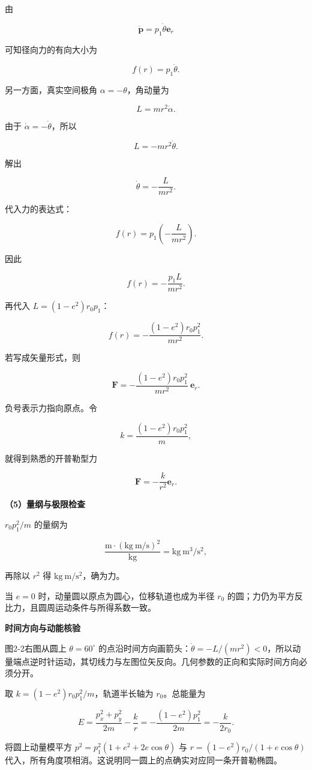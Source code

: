 \documentclass[12pt,a4paper,UTF8]{ctexart}
\begin{document}
由

\[\dot{\bm p}=p_1\dot\theta\bm e_r\]

可知径向力的有向大小为

\[f(r)=p_1\dot\theta.\]

另一方面，真实空间极角 \(\alpha=-\theta\)，角动量为

\[L=mr^2\dot\alpha.\]

由于 \(\dot\alpha=-\dot\theta\)，所以

\[L=-mr^2\dot\theta.\]

解出

\[\dot\theta=-\frac{L}{mr^2}.\]

代入力的表达式：

\[f(r)=p_1\left(-\frac{L}{mr^2}\right).\]

因此

\[f(r)=-\frac{p_1L}{m r^2}.\]

再代入 \(L=(1-e^2)r_0p_1\)：

\[\boxed{
f(r)=-\frac{(1-e^2)r_0p_1^2}{m r^2}
}.\]

若写成矢量形式，则

\[\boxed{
\bm F=-\frac{(1-e^2)r_0p_1^2}{m r^2}\ \bm e_r
}.\]

负号表示力指向原点。令

\[k=\frac{(1-e^2)r_0p_1^2}{m},\]

就得到熟悉的开普勒型力

\[\bm F=-\frac{k}{r^2}\bm e_r.\]

\textbf{（5）量纲与极限检查}

\(r_0p_1^2/m\) 的量纲为

\[\frac{\mathrm m\cdot(\mathrm{kg}\ \mathrm{m/s})^2}{\mathrm{kg}}
=\mathrm{kg}\ \mathrm{m^3/s^2},\]

再除以 \(r^2\) 得 \(\mathrm{kg}\ \mathrm{m/s^2}\)，确为力。

当 \(e=0\) 时，动量圆以原点为圆心，位移轨道也成为半径 \(r_0\)
的圆；力仍为平方反比力，且圆周运动条件与所得系数一致。

\textbf{时间方向与动能核验}

图2-2右图从圆上 \(\theta=60^\circ\)
的点沿时间方向画箭头：\(\dot\theta=-L/(mr^2)<0\)，所以动量端点逆时针运动，其切线力与左图位矢反向。几何参数的正向和实际时间方向必须分开。

取 \(k=(1-e^2)r_0p_1^2/m\)，轨道半长轴为 \(r_0\)。总能量为

\[E=\frac{p_x^2+p_y^2}{2m}-\frac{k}{r}
=-\frac{(1-e^2)p_1^2}{2m}=-\frac{k}{2r_0}.\]

将圆上动量模平方 \(p^2=p_1^2(1+e^2+2e\cos\theta)\) 与
\(r=(1-e^2)r_0/(1+e\cos\theta)\)
代入，所有角度项相消。这说明同一圆上的点确实对应同一条开普勒椭圆。
\end{document}
